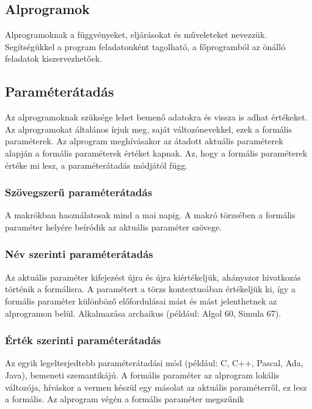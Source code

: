 \documentclass[margin=0px]{article}
\begin{document}
\subsection{Alprogramok}

Alprogramoknak a függvényeket, eljárásokat és műveleteket nevezzük. Segítségükkel a program feladatonként tagolható, a főprogramból az önálló feladatok kiszervezhetőek.

\subsection{Paraméterátadás}

Az alprogramoknak szüksége lehet bemenő adatokra és vissza is adhat értékeket. Az alprogramokat általános írjuk meg, saját változónevekkel, ezek a formális paraméterek. Az alprogram meghívásakor az átadott aktuális paraméterek alapján a formális paraméterek értéket kapnak. Az, hogy a formális paraméterek értéke mi lesz, a paraméterátadás módjától függ.

\subsubsection{Szövegszerű paraméterátadás}

A makrókban használatosak mind a mai napig. A makró törzsében a formális paraméter helyére beíródik az aktuális paraméter szövege.

\subsubsection{Név szerinti paraméterátadás}

Az aktuális paraméter kifejezést újra és újra kiértékeljük, ahányszor hivatkozás történik a formálisra. A paramétert a törzs kontextusában értékeljük ki, így a formális paraméter különböző előfordulásai mást és mást jelenthetnek az alprogramon belül.
Alkalmazása archaikus (például: Algol 60, Simula 67).

\subsubsection{Érték szerinti paraméterátadás}

Az egyik legelterjedtebb paraméterátadási mód (például: C, C++, Pascal, Ada, Java), bemeneti szemantikájú. A formális paraméter az alprogram lokális változója, híváskor a vermen készül egy másolat az aktuális paraméterről, ez lesz a formális. Az alprogram végén a formális paraméter megszűnik
\end{document}
